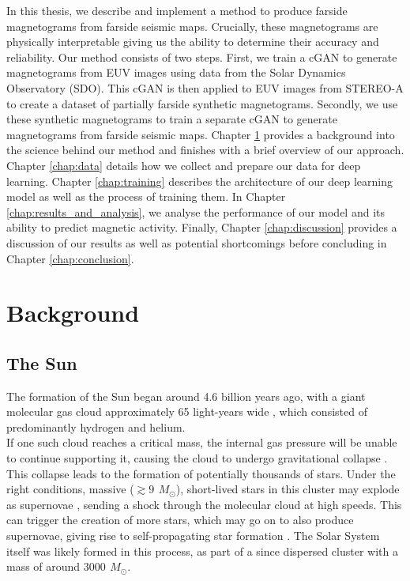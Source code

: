 \documentclass[11pt,a4paper,onecolumn]{report}
\begin{document}
In this thesis, we describe and implement a method to produce farside
magnetograms from farside seismic maps. Crucially, these magnetograms are
physically interpretable giving us the ability to determine their accuracy and
reliability. Our method consists of two steps. First, we train a cGAN to
generate magnetograms from EUV images using data from the Solar Dynamics
Observatory (SDO). This cGAN is then applied to EUV images from STEREO-A to
create a dataset of partially farside synthetic magnetograms. Secondly, we use
these synthetic magnetograms to train a separate cGAN to generate magnetograms
from farside seismic maps. Chapter \ref{chap:background} provides a background
into the science behind our method and finishes with a brief overview of our
approach. Chapter \ref{chap:data} details how we collect and prepare our data
for deep learning. Chapter \ref{chap:training} describes the architecture of our
deep learning model as well as the process of training them. In Chapter
\ref{chap:results_and_analysis}, we analyse the performance of our model and its
ability to predict magnetic activity. Finally, Chapter \ref{chap:discussion}
provides a discussion of our results as well as potential shortcomings before
concluding in Chapter \ref{chap:conclusion}.

%
%
%
%
%
%
\chapter{Background}
%
%
%
%
%
%
\label{chap:background}


%
%
%
%
%
%

\section{The Sun}
\label{sec:Sun}

The formation of the Sun began around 4.6 billion years ago, with a giant
molecular gas cloud approximately 65 light-years wide
\citep{montmerle_solar_2006}, which consisted of predominantly hydrogen and
helium. \\

If one such cloud reaches a critical mass, the internal gas pressure will be
unable to continue supporting it, causing the cloud to undergo gravitational
collapse \citep{jeans_stability_1902}. This collapse leads to the formation of
potentially thousands of stars. Under the right conditions, massive (\(\gtrsim
\SI{9}{\,M_\odot} \)), short-lived stars in this cluster may explode as
supernovae \citep{heger_how_2003}, sending a shock through the molecular cloud
at high speeds. This can trigger the creation of more stars, which may go on to
also produce supernovae, giving rise to self-propagating star formation
\citep{mueller_propagating_1976}. The Solar System itself was likely formed in
this process, as part of a since dispersed cluster with a mass of around
\(\SI{3000}{\,M_\odot} \)\citep{zwart_lost_2009, williams_astrophysical_2010}. \\
\end{document}
